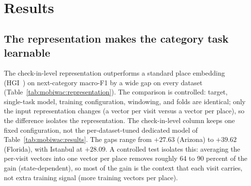\section{Results}
\label{sec:mobiwac:results}

\subsection{The representation makes the category task learnable}
\label{sec:mobiwac:results-part1}
The check-in-level representation outperforms a standard place embedding
(HGI~\cite{huang2023hgi}) on next-category macro-F1 by a wide gap on every
dataset (Table~\ref{tab:mobiwac:representation}). The comparison is controlled: target, single-task model, training configuration, windowing, and folds are identical; only the input representation changes (a vector per visit versus a vector per place), so the difference isolates the representation. The check-in-level column keeps one fixed configuration, not the per-dataset-tuned dedicated model of Table~\ref{tab:mobiwac:results}. The gaps range from $+27.63$ (Arizona) to $+39.62$ (Florida), with Istanbul at $+28.09$.
A controlled test isolates this: averaging the per-visit vectors into one vector per place removes roughly 64 to 90 percent of the gain (state-dependent), so most of the gain is the context that each visit carries, not extra training signal (more training vectors per place).


